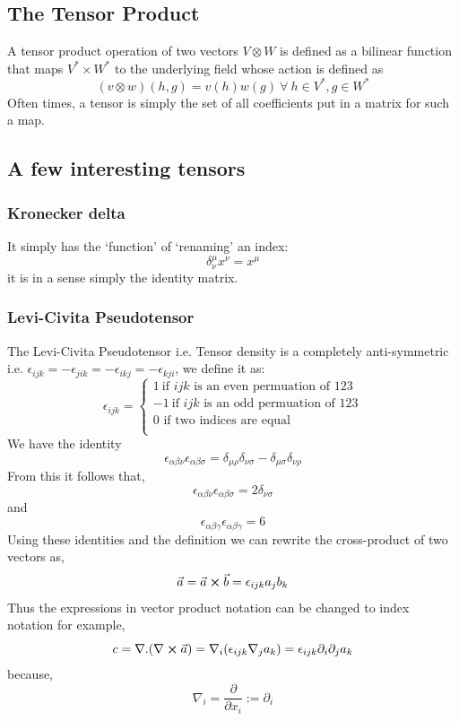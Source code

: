 \subsection{The Tensor Product}
A tensor product operation of two vectors $V \otimes W$ is defined as a bilinear function that maps $V^{*} \times W^{*}$ to the underlying field whose action is defined as
\begin{equation}
    (v \otimes w)(h,g) = v(h)w(g) \ \forall \ h \in V^{*}, g \in W^{*}
\end{equation}
Often times, a tensor is simply the set of all coefficients put in a matrix for such a map.
\subsection{A few interesting tensors}
\subsubsection{Kronecker delta}
It simply has the ‘function’ of ‘renaming’ an index:
$$\delta^{\mu}_{\nu} x^{\nu} = x^{\mu}$$
it is in a sense simply the identity matrix.
\subsubsection{Levi-Civita Pseudotensor}
\label{Levi}
The Levi-Civita Pseudotensor i.e. Tensor density is a completely anti-symmetric i.e. $\epsilon_{ijk} = -\epsilon_{jik} = -\epsilon_{ikj} = -\epsilon_{kji}$, we define it as:
\begin{equation}
\epsilon_{ijk} = \begin{cases}
1 \ \text{if } ijk \text{ is an even permuation of } 123\\
-1 \ \text{if } ijk \text{ is an odd permuation of } 123\\
0  \text{ if two indices are equal}\\
\end{cases}
\end{equation}
We have the identity
\begin{equation}
\epsilon_{\alpha \beta \nu}\epsilon_{\alpha \beta \sigma} = \delta_{\mu \rho} \delta_{\nu \sigma} - \delta_{\mu \sigma}\delta_{\nu \rho}
\end{equation}
From this it follows that,
\begin{equation}
\epsilon_{\alpha \beta \nu}\epsilon_{\alpha \beta \sigma} = 2\delta_{\nu \sigma}
\end{equation}
and
\begin{equation}
\epsilon_{\alpha \beta \gamma}\epsilon_{\alpha \beta \gamma} = 6
\end{equation}
Using these identities and the definition we can rewrite the cross-product of two vectors as,
\begin{equation}
\vec{a} = \vec{a} \cross \vec{b}  = \epsilon_{ijk}a_{j}b_{k}
\end{equation}
Thus the expressions in vector product notation can be changed to index notation for example,
$$
c = \nabla.(\nabla \cross \vec{a}) = \nabla_{i}(\epsilon_{ijk}\nabla_{j}a_{k}) = \epsilon_{ijk}\partial_{i}\partial_{j}a_{k}
$$
because,
$$\nabla_{i} = \frac{\partial}{\partial x_{i}} := \partial_{i}$$

